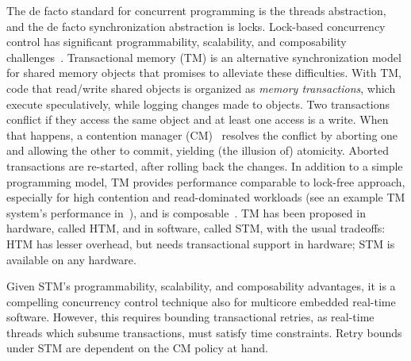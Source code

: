 \documentclass[preprint]{sigplanconf}
\begin{document}
The de facto standard for concurrent programming is the threads abstraction, and the 
de facto synchronization abstraction is locks. Lock-based concurrency control has significant programmability, scalability, and composability challenges~\cite{Herlihy:2006:AMP:1146381.1146382}.
 Transactional memory (TM) is an alternative synchronization model for shared memory objects that promises to alleviate these difficulties. With TM, code that read/write shared objects is organized as \textit{memory transactions}, which execute speculatively, while logging changes made to objects. Two transactions conflict if they access the same object and at least one access is a write. When that happens, a contention manager (CM)~\cite{Guerraoui:2005:TTT:1073814.1073863} resolves the conflict by aborting one and allowing the other to commit, yielding (the illusion of) atomicity. Aborted transactions are re-started, after rolling back the changes. In addition to a simple programming model, TM provides performance comparable to lock-free approach, especially for high contention and read-dominated workloads (see an example TM system's performance in~\cite{Saha:2006:MHP:1122971.1123001}), and is composable~\cite{Harris:2005:CMT:1065944.1065952}. TM has been proposed in hardware, called HTM, and in software, called STM, with the usual tradeoffs: HTM has lesser overhead, but needs transactional support in hardware; STM is available on any hardware.

Given STM's programmability, scalability, and composability advantages, it is a compelling concurrency control technique also for multicore embedded real-time software. However, this requires  bounding transactional  retries, as real-time threads which subsume transactions, must satisfy time constraints.  Retry bounds under STM are dependent on the CM policy at hand. 
\end{document}
